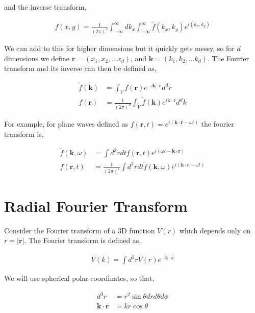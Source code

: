 \documentclass[11pt]{amsart}
\begin{document}
and the inverse transform,

\begin{align*}
  f(x, y) = \frac{1}{{(2\pi)}^2} \int_{-\infty}^{\infty}dk_x\int_{-\infty}^{\infty} \tilde{f}(k_x, k_y) e^{i(k_x, k_y)}
\end{align*}

We can add to this for higher dimensions but it quickly gets messy, so for $d$ dimensions we define $\mathbf{r} = (x_1, x_2, \dots x_d)$, and $\mathbf{k} = (k_1, k_2, \dots k_d)$. The Fourier transform and its inverse can then be defined as,

\begin{align*}
  \tilde{f}(\mathbf{k}) &= \int_V f(\mathbf{r}) e^{-i\mathbf{k}\cdot\mathbf{r}} d^d r \\
  f(\mathbf{r}) &= \frac{1}{{(2\pi)}^d} \int_{\tilde{V}} \tilde{f}(\mathbf{k}) e^{i\mathbf{k}\cdot\mathbf{r}} d^d k
\end{align*}

For example, for plane waves defined as $f(\mathbf{r}, t) = e^{i(\mathbf{k}\cdot\mathbf{r} - \omega t)}$ the fourier transform is,

\begin{align*}
  \tilde{f}(\mathbf{k}, \omega) &= \int d^3r dt f(\mathbf{r}, t) e^{i(\omega t - \mathbf{k}\cdot\mathbf{r})} \\
  f(\mathbf{r}, t) &= \frac{1}{{(2\pi)}^4} \int d^3r dt \tilde{f}(\mathbf{k}, \omega) e^{i(\mathbf{k}\cdot\mathbf{r} - \omega t)}
\end{align*}

\section{Radial Fourier Transform}

Consider the Fourier transform of a 3D function $V(r)$ which depends only on $r = |\mathbf{r}|$. The Fourier transform is defined as,

\begin{align*}
  \tilde{V}(k) = \int d^3r V(r) e^{-\mathbf{k}\cdot\mathbf{r}}
\end{align*}

We will use spherical polar coordinates, so that,

\begin{align*}
  d^3r &= r^2\sin{\theta}dr d\theta d\phi \\
  \mathbf{k}\cdot\mathbf{r} &= kr \cos{\theta}
\end{align*}
\end{document}
